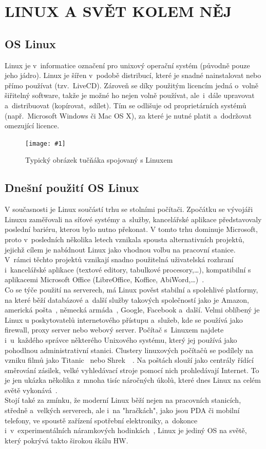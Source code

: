 \documentclass[a4paper,12pt]{article}
\newcommand{\upc}[1]{\uppercase{#1}} %
\newcommand{\obr}[3]{%
	\begin{figure}[h]
	\center\texttt{[image: \#1]}
	\caption{#3}
	\end{figure}
	}
\begin{document}
\section{\upc{Linux a svět kolem něj}}
\subsection{OS Linux}
Linux je v~informatice označení pro unixový operační systém (původně pouze jeho jádro). Linux je šířen v~podobě distribucí, které je snadné nainstalovat nebo přímo používat (tzv.~LiveCD). Zároveň se díky použitým licencím jedná o~volně šiřitelný software, takže je možné ho nejen volně používat, ale~i~dále upravovat a~distribuovat (kopírovat,~sdílet). Tím se odlišuje od proprietárních systémů (např.~Microsoft Windows či Mac OS X), za které je nutné platit a~dodržovat omezující licence.~\cite{WLinux}
\obr{./img/Linux_logo.png}{0.3}{Typický obrázek tučňáka spojovaný s Linuxem}

\subsection{Dnešní použití OS Linux}
V současnosti je Linux součástí trhu se stolními počítači. Zpočátku se vývojáři Linuxu zaměřovali na síťové systémy a~služby, kancelářské aplikace představovaly poslední bariéru, kterou bylo nutno překonat. V tomto trhu dominuje Microsoft, proto v~posledních několika letech vznikala spousta alternativních projektů, jejichž cílem je nabídnout Linux jako vhodnou volbu na pracovní stanice. V~rámci těchto projektů vznikají snadno použitelná uživatelská rozhraní i~kancelářské aplikace (textové editory, tabulkové procesory,…), kompatibilní s aplikacemi Microsoft Office (LibreOffice, Koffice, AbiWord,…)~\cite{LDP}.\\
Co se týče použití na serverech, má Linux pověst stabilní a spolehlivé platformy, na které běží databázové a~další služby takových společností jako je Amazon, americká pošta~\cite{AmericanPostLinux}, německá armáda~\cite{GermanArmyNoLinux}, Google, Facebook a~další. Velmi oblíbený je Linux u poskytovatelů internetového přístupu a~služeb, kde se používá jako firewall, proxy server nebo webový server. Počítač s~Linuxem najdete i~u~každého správce některého Unixového systému, který jej používá jako pohodlnou administrativní stanici. Clustery linuxových počítačů se podílely na vzniku filmů jako Titanic~\cite{TitanicLinux} nebo Shrek~\cite{Shrek2Linux}~\cite{Shrek3Linux}. Na poštách slouží jako centrály řídící směrování zásilek, velké vyhledávací stroje pomocí nich prohledávají Internet. To je jen ukázka několika z~mnoha tisíc náročných úkolů, které dnes Linux na celém světě vykonává~\cite{LDP}.\\
Stojí také za zmínku, že moderní Linux běží nejen na pracovních stanicích, středně a~velkých serverech, ale i~na "hračkách", jako jsou PDA či mobilní telefony, ve spoustě zařízení spotřební elektroniky, a~dokonce i~v~experimentálních náramkových hodinkách~\cite{LinuxHodinky}, Linux je jediný OS na světě, který pokrývá takto širokou škálu HW.~\cite{LDP}
\end{document}
